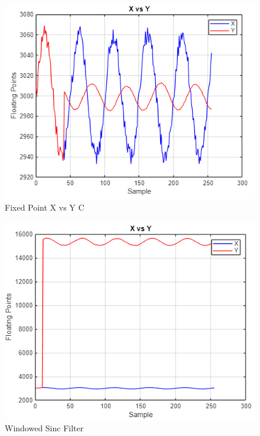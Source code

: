 \documentclass[journal]{IEEEtran}
\begin{document}
\begin{figure}[H]
    \centering
    \includegraphics[width=\linewidth]{3.3.png}
    \caption{Fixed Point X vs Y C}
    \vspace{1em} %
    \label{fig:part3C}
\end{figure}

\begin{figure}[H]
    \centering
    \includegraphics[width=\linewidth]{4.1.png}
    \caption{Windowed Sinc Filter}
    \label{fig:part4A}
\end{figure}
\end{document}

